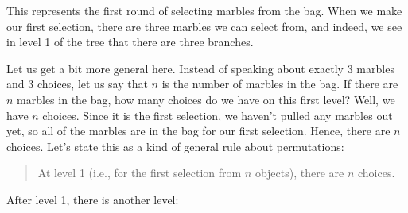 \documentclass[../../../main.tex]{subfiles}
\begin{document}
\noindent
This represents the first round of selecting marbles from the bag. When we make our first selection, there are three marbles we can select from, and indeed, we see in level 1 of the tree that there are three branches. 

Let us get a bit more general here. Instead of speaking about exactly 3 marbles and 3 choices, let us say that $n$ is the number of marbles in the bag. If there are $n$ marbles in the bag, how many choices do we have on this first level? Well, we have $n$ choices. Since it is the first selection, we haven't pulled any marbles out yet, so all of the marbles are in the bag for our first selection. Hence, there are $n$ choices. Let's state this as a kind of general rule about permutations:

\begin{quote}
  At level 1 (i.e., for the first selection from $n$ objects), there are $n$ choices.
\end{quote}

\noindent
After level 1, there is another level:
\end{document}
